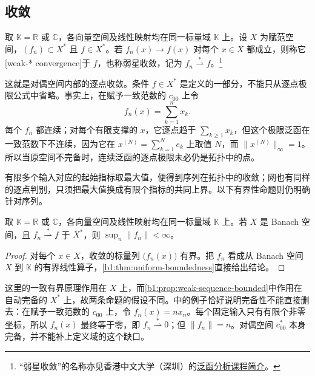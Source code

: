 \subsection{\WeakStar{}收敛}
\label{b1:subsec:090202}

\begin{definition}\label{b1:def:weak-star-convergence}
取 \(\mathbb K=\mathbb R\) 或 \(\mathbb C\)，各向量空间及线性映射均在同一标量域 \(\mathbb K\) 上。设 \(X\) 为赋范空间，\((f_n)\subset X^*\) 且 \(f\in X^*\)。若 \(f_n(x)\to f(x)\) 对每个 \(x\in X\) 都成立，则称它[weak-* convergence]于 \(f\)，也称弱星收敛，记为 \(f_n\overset{*}{\rightharpoonup}f\)。\footnote{“弱星收敛”的名称亦见香港中文大学（深圳）的\href{https://www.cuhk.edu.cn/zh-hans/course/8198}{泛函分析课程简介}。}
\end{definition}

这就是对偶空间内部的逐点收敛。条件 \(f\in X^*\) 是定义的一部分，不能只从逐点极限公式中省略。事实上，在赋予一致范数的 \(c_{00}\) 上令
\[
 f_n(x)=\sum_{k=1}^n x_k.
\]
每个 \(f_n\) 都连续；对每个有限支撑的 \(x\)，它逐点趋于 \(\sum_{k\geq1}x_k\)，但这个极限泛函在一致范数下不连续，因为它在 \(x^{(N)}=\sum_{k=1}^Ne_k\) 上取值 \(N\)，而 \(\|x^{(N)}\|_\infty=1\)。所以当原空间不完备时，连续泛函的逐点极限未必仍是\WeakStar{}拓扑中的点。

\ProseParagraphBreak

有限多个输入对应的起始指标取最大值，便得到序列在\WeakStar{}拓扑中的收敛；网也有同样的逐点判别，只须把最大值换成有限个指标的共同上界。以下有界性命题则仍明确针对序列。

\begin{proposition}\label{b1:prop:weak-star-sequence-bounded}
取 \(\mathbb K=\mathbb R\) 或 \(\mathbb C\)，各向量空间及线性映射均在同一标量域 \(\mathbb K\) 上。若 \(X\) 是 Banach 空间，且 \(f_n\overset{*}{\rightharpoonup}f\) 于 \(X^*\)，则 \(\sup_n\|f_n\|<\infty\)。
\end{proposition}
\begin{proof}
对每个 \(x\in X\)，收敛的标量列 \(\bigl(f_n(x)\bigr)\) 有界。把 \(f_n\) 看成从 Banach 空间 \(X\) 到 \(\mathbb K\) 的有界线性算子，\cref{b1:thm:uniform-boundedness}直接给出结论。
\end{proof}

这里的一致有界原理作用在 \(X\) 上，而\cref{b1:prop:weak-sequence-bounded}中作用在自动完备的 \(X^*\) 上，故两条命题的假设不同。中的例子恰好说明完备性不能直接删去：在赋予一致范数的 \(c_{00}\) 上，令 \(f_n(x)=nx_n\)。每个固定输入只有有限个非零坐标，所以 \(f_n(x)\) 最终等于零，即 \(f_n\overset{*}{\rightharpoonup}0\)；但 \(\|f_n\|=n\)。对偶空间 \(c_{00}^*\) 本身完备，并不能补上定义域的这个缺口。

